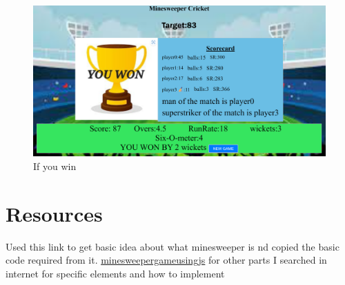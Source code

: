 \documentclass{article}
\begin{document}
\begin{figure}[H]
    \centering
    \includegraphics[width=1\textwidth]{ifyouwin.png}
    \caption{If you win}
    \label{fig:enter-label}
\end{figure}

\section{Resources}
Used this link to get basic idea about what minesweeper is nd copied the basic code required from it.
\href{https://iq.opengenus.org/minesweeper-game-using-js/}{minesweepergameusingjs}
for other parts I searched in internet for specific elements and how to implement
\end{document}
